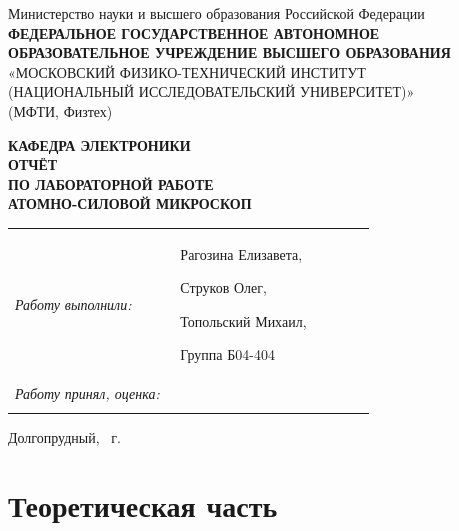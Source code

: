 \documentclass[12pt, a4paper]{article}
\begin{document}

\begin{titlepage}
\thispagestyle{empty}

\begin{center}
\small
Министерство науки и высшего образования Российской Федерации\\[2mm]
\textbf{ФЕДЕРАЛЬНОЕ ГОСУДАРСТВЕННОЕ АВТОНОМНОЕ
ОБРАЗОВАТЕЛЬНОЕ УЧРЕЖДЕНИЕ ВЫСШЕГО ОБРАЗОВАНИЯ}\\[1mm]
«МОСКОВСКИЙ ФИЗИКО-ТЕХНИЧЕСКИЙ ИНСТИТУТ\\
(НАЦИОНАЛЬНЫЙ ИССЛЕДОВАТЕЛЬСКИЙ УНИВЕРСИТЕТ)»\\
(МФТИ, Физтех)
\end{center}

\vspace{18mm}

\begin{center}
\large \textbf{КАФЕДРА ЭЛЕКТРОНИКИ}\\[10mm]
\Large \textbf{ОТЧЁТ}\\[2mm]
\large \textbf{ПО ЛАБОРАТОРНОЙ РАБОТЕ}\\[14mm]
\Large \textbf{АТОМНО-СИЛОВОЙ МИКРОСКОП}
\end{center}

\vfill

\noindent
\begin{tabular}{@{}p{0.44\linewidth}p{0.52\linewidth}@{}}
\textit{Работу выполнили:} & Рагозина Елизавета,

Струков Олег,

Топольский Михаил,

Группа Б04-404 \\[8mm]

\textit{Работу принял, оценка:} & \\[3mm]
 \\
\end{tabular}


\vspace{12mm}

\begin{center}
\small Долгопрудный, \the\year{}~г.
\end{center}

\end{titlepage}




\newpage
{}


\section*{Теоретическая часть}
\end{document}
